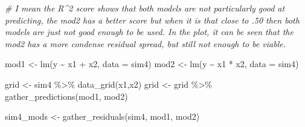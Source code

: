 \documentclass[
]{article}
\newenvironment{Shaded}{\begin{snugshade}}{\end{snugshade}}
\newcommand{\AttributeTok}[1]{\textcolor[rgb]{0.77,0.63,0.00}{#1}}
\newcommand{\CommentTok}[1]{\textcolor[rgb]{0.56,0.35,0.01}{\textit{#1}}}
\newcommand{\DecValTok}[1]{\textcolor[rgb]{0.00,0.00,0.81}{#1}}
\newcommand{\FunctionTok}[1]{\textcolor[rgb]{0.00,0.00,0.00}{#1}}
\newcommand{\NormalTok}[1]{#1}
\newcommand{\OtherTok}[1]{\textcolor[rgb]{0.56,0.35,0.01}{#1}}
\newcommand{\SpecialCharTok}[1]{\textcolor[rgb]{0.00,0.00,0.00}{#1}}
\newcommand{\StringTok}[1]{\textcolor[rgb]{0.31,0.60,0.02}{#1}}
\begin{document}
\begin{Shaded}
\begin{Highlighting}[]
\CommentTok{\# I mean the R\^{}2 score shows that both models are not particularly good at predicting, the mod2 has a better score but when it is that close to .50 then both models are just not good enough to be used. In the plot, it can be seen that the mod2 has a more condense residual spread, but still not enough to be viable.}
\end{Highlighting}
\end{Shaded}

\begin{Shaded}
\begin{Highlighting}[]
\NormalTok{mod1 }\OtherTok{\textless{}{-}} \FunctionTok{lm}\NormalTok{(y }\SpecialCharTok{\textasciitilde{}}\NormalTok{ x1 }\SpecialCharTok{+}\NormalTok{ x2, }\AttributeTok{data =}\NormalTok{ sim4)}
\NormalTok{mod2 }\OtherTok{\textless{}{-}} \FunctionTok{lm}\NormalTok{(y }\SpecialCharTok{\textasciitilde{}}\NormalTok{ x1 }\SpecialCharTok{*}\NormalTok{ x2, }\AttributeTok{data =}\NormalTok{ sim4)}
\end{Highlighting}
\end{Shaded}

\begin{Shaded}
\begin{Highlighting}[]
\NormalTok{grid }\OtherTok{\textless{}{-}}\NormalTok{ sim4 }\SpecialCharTok{\%\textgreater{}\%}
  \FunctionTok{data\_grid}\NormalTok{(x1,x2)}
\NormalTok{grid }\OtherTok{\textless{}{-}}\NormalTok{ grid }\SpecialCharTok{\%\textgreater{}\%}
  \FunctionTok{gather\_predictions}\NormalTok{(mod1, mod2)}

\NormalTok{sim4\_mods }\OtherTok{\textless{}{-}} \FunctionTok{gather\_residuals}\NormalTok{(sim4, mod1, mod2)}
\end{Highlighting}
\end{Shaded}

\begin{Shaded}
\end{Shaded}
\end{document}
